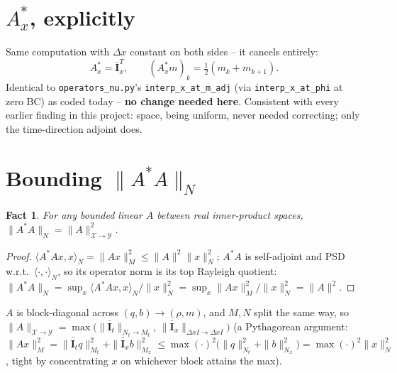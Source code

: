 \documentclass[11pt]{article}
\newtheorem{fact}{Fact}
\newcommand{\dx}{\Delta x}
\newcommand{\code}[1]{\texttt{#1}}
\begin{document}
\section{$A_x^*$, explicitly}
\label{sec:Ax}

Same computation with $\dx$ constant on both sides -- it cancels entirely:
\begin{equation}
  A_x^* = \bar{\mathbf I}_x^T, \qquad (A_x^*m)_k = \tfrac12(m_k+m_{k+1}).
\end{equation}
Identical to \code{operators\_nu.py}'s \code{interp\_x\_at\_m\_adj} (via
\code{interp\_x\_at\_phi} at zero BC) as coded today -- \textbf{no change needed here}.
Consistent with every earlier finding in this project: space, being uniform, never needed
correcting; only the time-direction adjoint does.

\section{Bounding $\|A^*A\|_N$}
\label{sec:bound}

\begin{fact}
\label{fact:AstarA}
For any bounded linear $A$ between real inner-product spaces, $\|A^*A\|_N=\|A\|_{
\mathcal X\to\mathcal Y}^2$.
\end{fact}
\begin{proof}
$\langle A^*Ax,x\rangle_N=\|Ax\|_M^2\le\|A\|^2\|x\|_N^2$; $A^*A$ is self-adjoint and PSD
w.r.t.\ $\langle\cdot,\cdot\rangle_N$, so its operator norm is its top Rayleigh quotient:
$\|A^*A\|_N=\sup_x\langle A^*Ax,x\rangle_N/\|x\|_N^2=\sup_x\|Ax\|_M^2/\|x\|_N^2=\|A\|^2$.
\end{proof}

$A$ is block-diagonal across $(q,b)\to(\rho,m)$, and $M,N$ split the same way, so
$\|A\|_{\mathcal X\to\mathcal Y}=\max\bigl(\|\bar{\mathbf I}_t\|_{N_t\to M_t},\,\|
\bar{\mathbf I}_x\|_{\dx I\to\dx I}\bigr)$ (a Pythagorean argument: $\|Ax\|_M^2=\|
\bar{\mathbf I}_tq\|_{M_t}^2+\|\bar{\mathbf I}_xb\|_{M_x}^2\le\max(\cdot)^2\bigl(\|q\|_{
N_t}^2+\|b\|_{N_x}^2\bigr)=\max(\cdot)^2\|x\|_N^2$, tight by concentrating $x$ on
whichever block attains the max).
\end{document}
